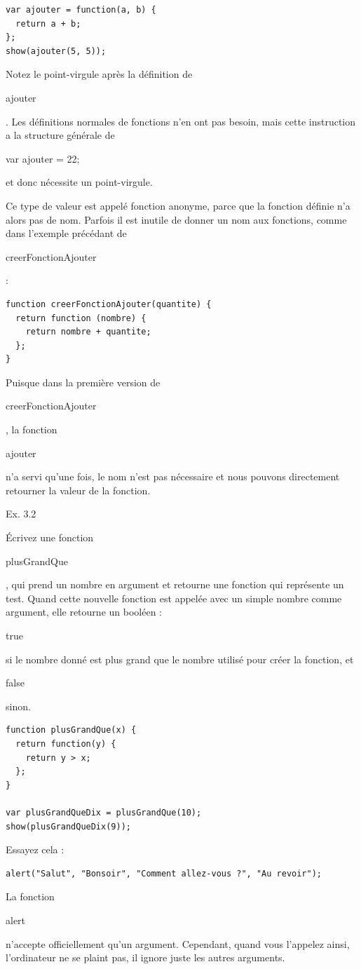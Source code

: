 \documentclass{FramateX}
\renewcommand{\texttt}[1]{\begin{sffamily}{#1}\end{sffamily}}
\begin{document}
\begin{lstlisting}
var ajouter = function(a, b) {
  return a + b;
};
show(ajouter(5, 5));
\end{lstlisting}
Notez le point-virgule après la définition de \texttt{ajouter}. Les
définitions normales de fonctions n'en ont pas besoin, mais cette
instruction a la structure générale de \texttt{var ajouter = 22;} et
donc nécessite un point-virgule.

Ce type de valeur est appelé fonction anonyme, parce que la fonction
définie n'a alors pas de nom. Parfois il est inutile de donner un nom
aux fonctions, comme dans l'exemple précédant de
\texttt{creerFonctionAjouter} :

\begin{lstlisting}
function creerFonctionAjouter(quantite) {
  return function (nombre) {
    return nombre + quantite;
  };
}
\end{lstlisting}
Puisque dans la première version de \texttt{creerFonctionAjouter}, la
fonction \texttt{ajouter} n'a servi qu'une fois, le nom n'est pas
nécessaire et nous pouvons directement retourner la valeur de la
fonction.

\begin{center}\end{center}

Ex. 3.2

Écrivez une fonction \texttt{plusGrandQue}, qui prend un nombre en
argument et retourne une fonction qui représente un test. Quand cette
nouvelle fonction est appelée avec un simple nombre comme argument, elle
retourne un booléen : \texttt{true} si le nombre donné est plus grand
que le nombre utilisé pour créer la fonction, et \texttt{false} sinon.

\begin{lstlisting}
function plusGrandQue(x) {
  return function(y) {
    return y > x;
  };
}

var plusGrandQueDix = plusGrandQue(10);
show(plusGrandQueDix(9));
\end{lstlisting}
\begin{center}\end{center}

Essayez cela :

\begin{lstlisting}
alert("Salut", "Bonsoir", "Comment allez-vous ?", "Au revoir");
\end{lstlisting}
La fonction \texttt{alert} n'accepte officiellement qu'un argument.
Cependant, quand vous l'appelez ainsi, l'ordinateur ne se plaint pas, il
ignore juste les autres arguments.
\end{document}
